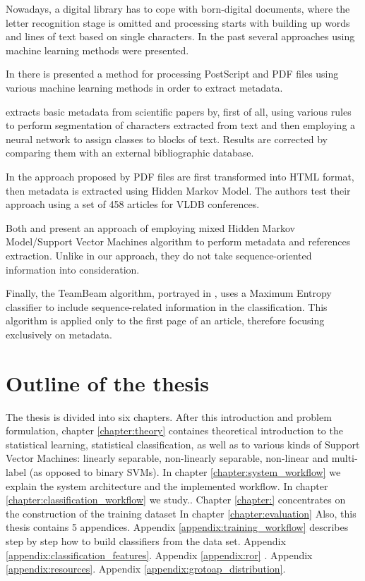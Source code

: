 Nowadays, a digital library has to cope with born-digital documents, where the letter recognition stage is omitted and processing starts with building up words and lines of text based on single characters. In the past several approaches using machine learning methods were presented.

In \cite{Esposito2008} there is presented a method for processing PostScript and PDF files using various machine learning methods in order to extract metadata.

\cite{Marinai2009} extracts basic metadata from scientific papers by, first of all, using various rules to perform segmentation of characters extracted from text and then employing a neural network to assign classes to blocks of text. Results are corrected by comparing them with an external bibliographic database.

In the approach proposed by \cite{Chen.2010} PDF files are first transformed into HTML format, then metadata is extracted using Hidden Markov Model. The authors test their approach using a set of 458 articles for VLDB conferences.

Both \cite{HuiHan} and \cite{HuiHan2005} present an approach of employing mixed Hidden Markov Model/Support Vector Machines algorithm to perform metadata and references extraction. Unlike in our approach, they do not take sequence-oriented information into consideration.

Finally, the TeamBeam algorithm, portrayed in \cite{Kern2012}, uses a Maximum Entropy classifier to include sequence-related information in the classification. This algorithm is applied only to the first page of an article, therefore focusing exclusively on metadata.

\section{Outline of the thesis}
The thesis is divided into six chapters. After this introduction and problem formulation, chapter \ref{chapter:theory} containes theoretical introduction to the statistical learning, statistical classification, as well as to various kinds of Support Vector Machines: linearly separable, non-linearly separable, non-linear and multi-label (as opposed to binary SVMs).
In chapter \ref{chapter:system_workflow} we explain the system architecture and the implemented workflow. 
In chapter \ref{chapter:classification_workflow} we study..
Chapter \ref{chapter:} concentrates on the construction of the training dataset
In chapter \ref{chapter:evaluation}
Also, this thesis contains 5 appendices. Appendix \ref{appendix:training_workflow} describes step by step how to build classifiers from the data set. Appendix \ref{appendix:classification_features}. Appendix \ref{appendix:ror} . Appendix \ref{appendix:resources}. Appendix \ref{appendix:grotoap_distribution}.
